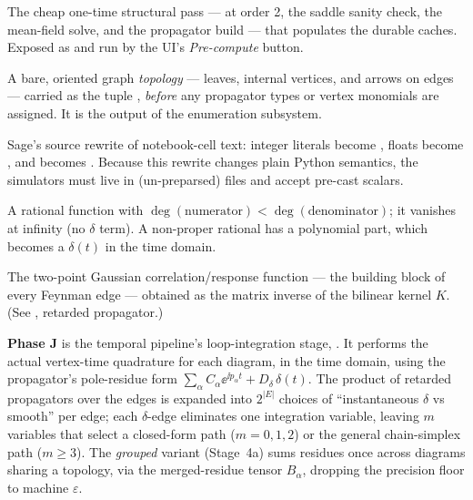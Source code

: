 \begin{description}[leftmargin=0pt,style=nextline]
  \item[Precompute] The cheap one-time structural pass ---  at order 2,
        the saddle sanity check, the mean-field solve, and the propagator build ---
        that populates the durable caches. Exposed as 
        and run by the UI's \emph{Pre-compute} button.

  \item[Prediagram] A bare, oriented graph \emph{topology} --- leaves, internal
        vertices, and arrows on edges --- carried as the tuple
        , \emph{before} any propagator types or vertex
        monomials are assigned. It is the output of the enumeration subsystem.

  \item[Preparse / SageMath preparser] Sage's source rewrite of notebook-cell text:
        integer literals become , floats become , and
        \code{\^{}} becomes \code{**}. Because this rewrite changes plain Python
        semantics, the simulators must live in (un-preparsed)  files and
        accept pre-cast scalars.

  \item[Proper / strictly proper rational] A rational function with
        $\deg(\text{numerator})<\deg(\text{denominator})$; it vanishes at infinity
        (no $\delta$ term). A non-proper rational has a polynomial part, which becomes
        a $\delta(t)$ in the time domain.

  \item[Propagator $G=K^{-1}$] The two-point Gaussian correlation/response function
        --- the building block of every Feynman edge --- obtained as the matrix
        inverse of the bilinear kernel $K$. (See , retarded propagator.)

\end{description}

\begin{defn}
\textbf{Phase J} is the temporal pipeline's loop-integration stage,
. It performs the actual vertex-time quadrature for
each diagram, in the time domain, using the propagator's pole-residue form
$\sum_\alpha C_\alpha\ee^{\ii p_\alpha t}+D_\delta\,\delta(t)$. The product of
retarded propagators over the edges is expanded into $2^{|E|}$ choices of
``instantaneous $\delta$ vs smooth'' per edge; each $\delta$-edge eliminates one
integration variable, leaving $m$ variables that select a closed-form path
($m=0,1,2$) or the general chain-simplex path ($m\ge 3$). The \emph{grouped}
variant (Stage~4a) sums residues once across diagrams sharing a topology, via the
merged-residue tensor $B_\alpha$, dropping the precision floor to machine
$\varepsilon$.
\end{defn}

